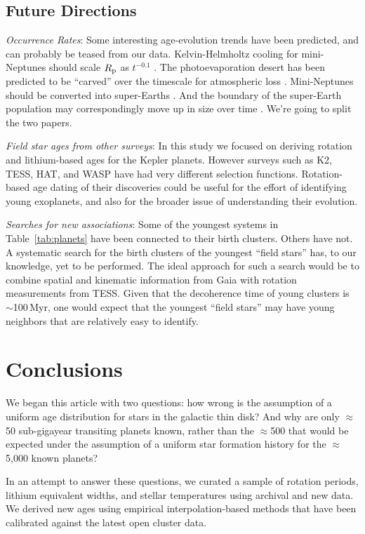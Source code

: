 \documentclass[11pt,twocolumn,tighten]{aastex63}
\begin{document}
\subsection{Future Directions}
{\it Occurrence Rates}: Some interesting
age-evolution trends have been predicted, and can probably be teased
from our data.  
Kelvin-Helmholtz cooling for mini-Neptunes should scale $R_{\rm p}$ as
$t^{-0.1}$ \citep{Gupta_2019}.
The photoevaporation desert has been predicted to be ``carved'' over the timescale
for atmospheric loss \citep{Owen_Lai_2018}.
Mini-Neptunes should be converted into super-Earths \citep{Rogers_2021}.
And the boundary of the super-Earth population may correspondingly move up in size over
time \citep{David_2021}.
We're going to split the two papers.

{\it Field star ages from other surveys}:
In this study we focused on deriving rotation and lithium-based ages for the Kepler
planets.  However surveys such as K2, TESS, HAT, and WASP have had very different selection functions.
Rotation-based age dating of their discoveries could be useful for the effort
of identifying young exoplanets, and also for the broader issue of understanding
their evolution.

{\it Searches for new associations}:
Some of the youngest systems in Table~\ref{tab:planets} have been
connected to their birth clusters.
Others have not.
A systematic search for the birth clusters of the youngest ``field stars'' has, to our knowledge,
yet to be performed.
The ideal approach for such a search would be to combine spatial and kinematic information
from Gaia with rotation measurements from TESS.
Given that the decoherence time of young clusters is $\sim$100\,Myr, one would expect that
the youngest ``field stars'' may have young neighbors that are relatively easy to
identify.




\section{Conclusions}
\label{sec:conclusions}

We began this article with two questions: how wrong is the
assumption of a uniform age distribution for stars in the galactic
thin disk?  And why are only $\approx$50 sub-gigayear transiting
planets known, rather than the $\approx$500 that would be expected
under the assumption of a uniform star formation history for the
$\approx$5{,}000 known planets?

In an attempt to answer these questions, we curated a sample of
rotation periods, lithium equivalent widths, and stellar temperatures
using archival and new data.  We derived new ages
using empirical interpolation-based methods that have been
calibrated against the latest open cluster data.
\end{document}
